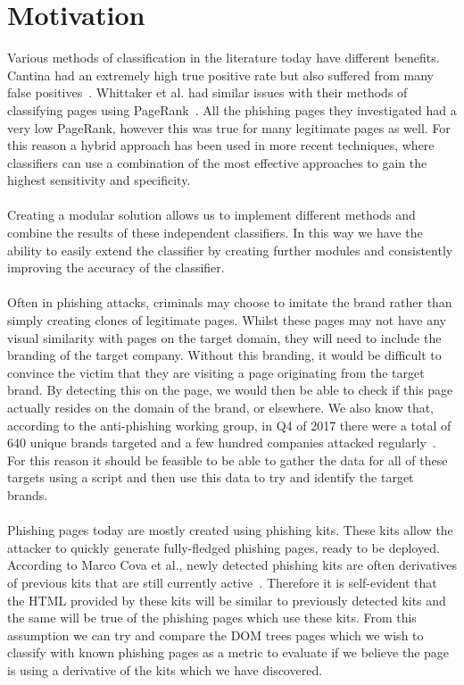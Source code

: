 \documentclass[12pt,twoside]{report}
\begin{document}
\section{Motivation}\label{motivation}
Various methods of classification in the literature today have different benefits. Cantina had an extremely high true positive rate but also suffered from many false positives~\cite{cantina}. Whittaker et al. had similar issues with their methods of classifying pages using PageRank~\cite{largescaleautomatic}. All the phishing pages they investigated had a very low PageRank, however this was true for many legitimate pages as well. For this reason a hybrid approach has been used in more recent techniques, where classifiers can use a combination of the most effective approaches to gain the highest sensitivity and specificity. 
\\\\
Creating a modular solution allows us to implement different methods and combine the results of these independent classifiers. In this way we have the ability to easily extend the classifier by creating further modules and consistently improving the accuracy of the classifier.
\\\\
Often in phishing attacks, criminals may choose to imitate the brand rather than simply creating clones of legitimate pages. Whilst these pages may not have any visual similarity with pages on the target domain, they will need to include the branding of the target company. Without this branding, it would be difficult to convince the victim that they are visiting a page originating from the target brand. By detecting this on the page, we would then be able to check if this page actually resides on the domain of the brand, or elsewhere. We also know that, according to the anti-phishing working group, in Q4 of 2017 there were a total of 640 unique brands targeted and a few hundred companies attacked regularly~\cite{apwg}. For this reason it should be feasible to be able to gather the data for all of these targets using a script and then use this data to try and identify the target brands.
\\\\
Phishing pages today are mostly created using phishing kits. These kits allow the attacker to quickly generate fully-fledged phishing pages, ready to be deployed. According to Marco Cova et al., newly detected phishing kits are often derivatives of previous kits that are still currently active~\cite{freephish}. Therefore it is self-evident that the HTML provided by these kits will be similar to previously detected kits and the same will be true of the phishing pages which use these kits. From this assumption we can try and compare the DOM trees pages which we wish to classify with known phishing pages as a metric to evaluate if we believe the page is using a derivative of the kits which we have discovered.
\end{document}
